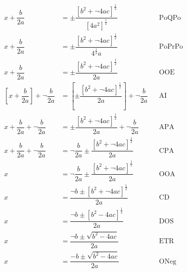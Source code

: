\documentclass[20150903-160354-rs2.2-MarksMathNotebook.tex]{subfiles}
\begin{document}
\begin{align*}
x+ \dfrac{b}{2a}  &=\pm \dfrac{\left[b^2+ \neg 4ac \right]^{\frac{1}{2}}}{\left[4a^2\right]^{\frac{1}{2}}} && \text{PoQPo}\\
x+ \dfrac{b}{2a}  &=\pm \dfrac{\left[b^2+ \neg 4ac \right]^{\frac{1}{2}}}{4^{\frac{1}{2}} a} && \text{PoPrPo}\\
x+ \dfrac{b}{2a}  &=\pm \dfrac{\left[b^2+ \neg 4ac \right]^{\frac{1}{2}}}{2a} && \text{OOE}\\
\left[x+ \dfrac{b}{2a}\right] +  \neg   \dfrac{b}{2a} &= \left[\pm\dfrac{\left[b^2+ \neg 4ac \right]^{\frac{1}{2}}}{2a}\right] + \neg \dfrac{b}{2a} && \text{AI}\\
x+ \dfrac{b}{2a} +  \neg   \dfrac{b}{2a} &= \pm\dfrac{\left[b^2+ \neg 4ac \right]^{\frac{1}{2}}}{2a} + \neg \dfrac{b}{2a} && \text{APA}\\
x+ \dfrac{b}{2a} + \neg   \dfrac{b}{2a} &=\neg   \dfrac{b}{2a} \pm\dfrac{\left[b^2+ \neg 4ac \right]^{\frac{1}{2}}}{2a} && \text{CPA}\\
x &=\neg   \dfrac{b}{2a}  \pm\dfrac{\left[b^2+ \neg 4ac \right]^{\frac{1}{2}}}{2a} && \text{OOA}\\
x &= \dfrac{\neg  b  \pm {\left[b^2+ \neg 4ac \right]^{\frac{1}{2}}}}{2a} && \text{CD}\\
x &= \dfrac{\neg  b  \pm {\left[b^2 - 4ac \right]^{\frac{1}{2}}}}{2a} && \text{DOS}\\
x &= \dfrac{\neg  b  \pm {\sqrt{b^2 - 4ac}}}{2a} && \text{ETR}\\
x &= \dfrac{-  b  \pm {\sqrt{b^2 - 4ac}}}{2a} && \text{ONeg}
\end{align*}
\end{document}

